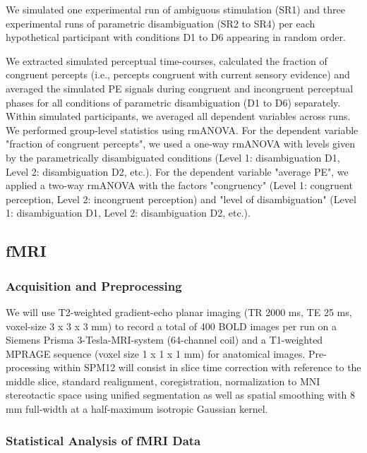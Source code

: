 \documentclass[12pt]{article}
\begin{document}
We simulated one experimental run of ambiguous stimulation (SR1) and three experimental runs of parametric disambiguation (SR2 to SR4) per each hypothetical participant with conditions D1 to D6 appearing in random order.

We extracted simulated perceptual time-courses, calculated the fraction of congruent percepts (i.e., percepts congruent with current sensory evidence) and averaged the simulated PE signals during congruent and incongruent perceptual phases for all conditions of parametric disambiguation (D1 to D6) separately. Within simulated participants, we averaged all dependent variables across runs. We performed group-level statistics using rmANOVA. For the dependent variable "fraction of congruent percepts", we used a one-way rmANOVA with levels given by the parametrically disambiguated conditions (Level 1: disambiguation D1, Level 2: disambiguation D2, etc.). For the dependent variable "average PE", we applied a two-way rmANOVA with the factors "congruency" (Level 1: congruent perception, Level 2: incongruent perception) and "level of disambiguation" (Level 1: disambiguation D1, Level 2: disambiguation D2, etc.). 

\subsection{fMRI}

\subsubsection{Acquisition and Preprocessing}

We will use T2-weighted gradient-echo planar imaging (TR 2000 ms, TE 25 ms, voxel-size 3 x 3 x 3 mm) to record a total of 400 BOLD images per run on a Siemens Prisma 3-Tesla-MRI-system (64-channel coil) and a T1-weighted MPRAGE sequence (voxel size 1 x 1 x 1 mm) for anatomical images. Pre-processing within SPM12 will consist in slice time correction with reference to the middle slice, standard realignment, coregistration, normalization to MNI stereotactic space using unified segmentation as well as spatial smoothing with 8 mm full-width at a half-maximum isotropic Gaussian kernel.

\subsubsection{Statistical Analysis of fMRI Data}
\end{document}
